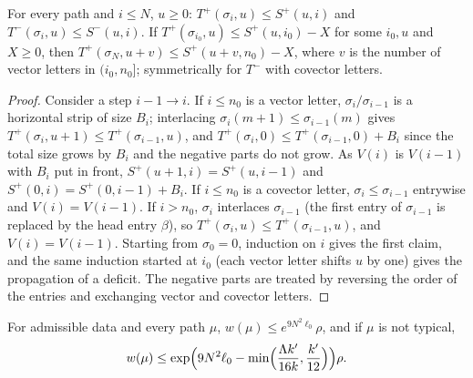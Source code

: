 \begin{lemma}\label{pf:linkG:tails}
For every path and $i\le N$, $u\ge0$: $T^+(\sigma_i,u)\le S^+(u,i)$ and $T^-(\sigma_i,u)\le S^-(u,i)$. If
$T^+(\sigma_{i_0},u)\le S^+(u,i_0)-X$ for some $i_0,u$ and $X\ge0$, then $T^+(\sigma_N,u+v)\le S^+(u+v,n_0)-X$, where $v$ is the
number of vector letters in $(i_0,n_0]$; symmetrically for $T^-$ with covector letters.
\end{lemma}

\begin{proof}
Consider a step $i-1\to i$. If $i\le n_0$ is a vector letter, $\sigma_i/\sigma_{i-1}$ is a horizontal strip of size $B_i$; interlacing
$\sigma_i(m+1)\le\sigma_{i-1}(m)$ gives $T^+(\sigma_i,u+1)\le T^+(\sigma_{i-1},u)$, and $T^+(\sigma_i,0)\le T^+(\sigma_{i-1},0)+B_i$ since the
total size grows by $B_i$ and the negative parts do not grow. As $V(i)$ is $V(i-1)$ with $B_i$ put in front,
$S^+(u+1,i)=S^+(u,i-1)$ and $S^+(0,i)=S^+(0,i-1)+B_i$. If $i\le n_0$ is a covector letter, $\sigma_i\le\sigma_{i-1}$ entrywise and
$V(i)=V(i-1)$. If $i>n_0$, $\sigma_i$ interlaces $\sigma_{i-1}$ (the first entry of $\sigma_{i-1}$ is replaced by the head entry
$\beta$), so $T^+(\sigma_i,u)\le T^+(\sigma_{i-1},u)$, and $V(i)=V(i-1)$. Starting from $\sigma_0=0$, induction on $i$ gives the first
claim, and the same induction started at $i_0$ (each vector letter shifts $u$ by one) gives the propagation of a deficit.
The negative parts are treated by reversing the order of the entries and exchanging vector and covector letters.
\end{proof}

\begin{theorem}\label{pf:linkG:lemmaT}
For admissible data and every path $\mu$, $w(\mu)\le e^{9N^2\ell_0}\rho$, and if $\mu$ is not typical,
\[
w(\mu)\le\exp\Bigl(9N^2\ell_0-\min\Bigl(\frac{\Lambda k'}{16k},\frac{k'}{12}\Bigr)\Bigr)\rho .
\]
\end{theorem}

